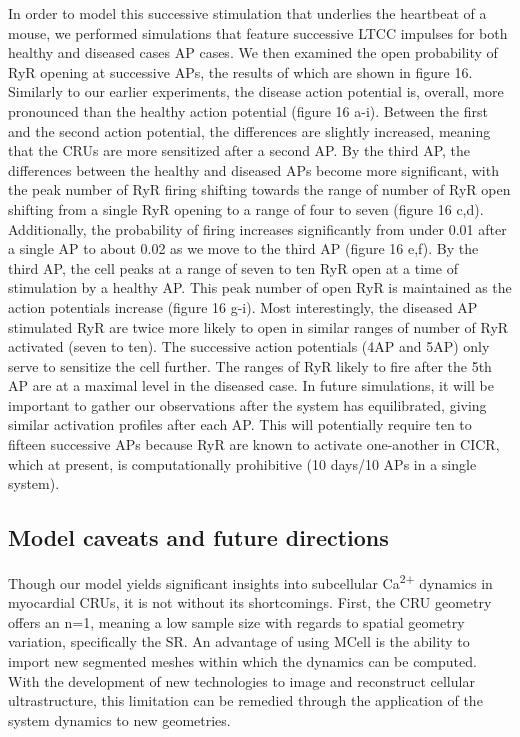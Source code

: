 \documentclass[12pt]{ucsddissertation}
\begin{document}
In order to model this successive stimulation that underlies the heartbeat of a mouse, we performed simulations that feature successive LTCC impulses for both healthy and diseased cases AP cases. We then examined the open probability of RyR opening at successive APs, the results of which are shown in figure 16. Similarly to our earlier experiments, the disease action potential is, overall, more pronounced than the healthy action potential (figure 16 a-i). Between the first and the second action potential, the differences are slightly increased, meaning that the CRUs are more sensitized after a second AP. By the third AP, the differences between the healthy and diseased APs become more significant, with the peak number of RyR firing shifting towards the range of number of RyR open shifting from
a single RyR opening to a range of four to seven (figure 16 c,d). Additionally, the probability of firing increases significantly from under 0.01 after a single AP to about 0.02 as we move to the third AP (figure 16 e,f). By the third AP, the cell peaks at a range of seven to ten RyR open at a time of stimulation by a healthy AP. This peak number of open RyR is maintained as the action potentials increase (figure 16 g-i). Most interestingly, the diseased AP stimulated RyR are twice more likely to open in similar ranges of number of RyR activated (seven to ten). The successive action potentials (4AP and 5AP) only serve to sensitize the cell further. The ranges of RyR likely to fire after the 5th AP are at a maximal level in the diseased case. In future simulations, it will be important to gather our observations after the system has equilibrated, giving similar activation profiles after each AP. This will potentially require ten to fifteen successive APs because RyR are known to activate one-another in CICR, which at present, is computationally prohibitive (10 days/10 APs in a single system).


\subsection{Model caveats and future directions}
Though our model yields significant insights into subcellular Ca\textsuperscript{2+} dynamics in myocardial CRUs, it is not without its shortcomings. First, the CRU geometry offers an n=1, meaning a low sample size with regards to spatial geometry variation, specifically the SR. An advantage of using MCell is the ability to import new segmented meshes within which the dynamics can be computed. With the development of new technologies to image \cite{Kolstad2018} and reconstruct \cite{Lee2018} cellular ultrastructure, this limitation can be remedied through the application of the system dynamics to new geometries.
\end{document}
